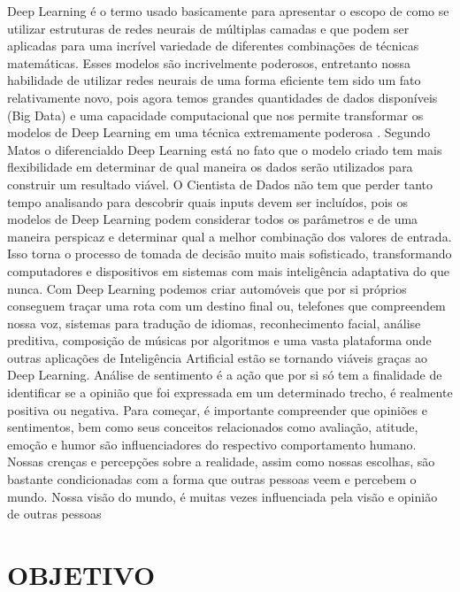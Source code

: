 \documentclass[12pt, a4paper]{article}
\begin{document}
Deep Learning é o termo usado basicamente para apresentar o escopo de como se utilizar estruturas de redes neurais de múltiplas camadas e que podem ser aplicadas para uma incrível variedade de diferentes combinações de técnicas matemáticas. Esses modelos são incrivelmente poderosos, entretanto nossa habilidade de utilizar redes neurais de uma forma eficiente tem sido um fato relativamente novo, pois agora temos grandes quantidades de dados disponíveis (Big Data) e uma capacidade computacional que nos permite transformar os modelos de Deep Learning em uma técnica extremamente poderosa \cite{matos}.
Segundo Matos \citeyear{matos2} o diferencialdo Deep Learning está no fato que o modelo criado tem mais flexibilidade em determinar de qual maneira os dados serão utilizados para construir um resultado viável. O Cientista de Dados não tem que perder tanto tempo analisando para descobrir quais inputs devem ser incluídos, pois os modelos de Deep Learning podem considerar todos os parâmetros e de uma maneira perspicaz e determinar qual a melhor combinação dos valores de entrada. Isso torna o processo de tomada de decisão muito mais sofisticado, transformando computadores e dispositivos em sistemas com mais inteligência adaptativa do que nunca. Com Deep Learning podemos criar automóveis que por si próprios conseguem traçar uma rota com um destino final ou, telefones que compreendem nossa voz, sistemas para tradução de idiomas, reconhecimento facial, análise preditiva, composição de músicas por algoritmos e uma vasta plataforma onde outras aplicações de Inteligência Artificial estão se tornando viáveis graças ao Deep Learning.
Análise de sentimento é a ação que por si só tem a finalidade de identificar se a opinião que foi expressada em um determinado trecho, é realmente positiva ou negativa.
Para começar, é importante compreender que opiniões e sentimentos, bem como seus conceitos relacionados como avaliação, atitude, emoção e humor são influenciadores do respectivo comportamento humano. Nossas crenças e percepções sobre a realidade, assim como nossas escolhas, são bastante condicionadas com a forma que outras pessoas veem e percebem o mundo. Nossa visão do mundo, é muitas vezes influenciada pela visão e opinião de outras pessoas \cite{matos}

\newpage
\section{OBJETIVO}
\end{document}
